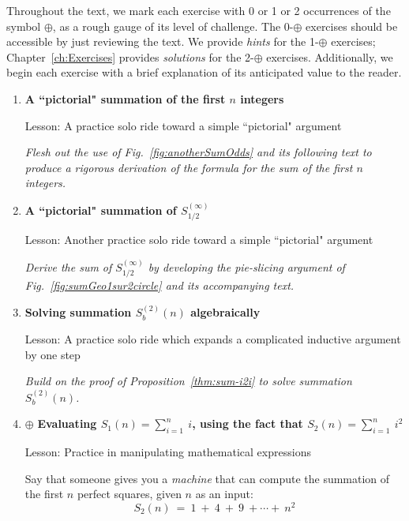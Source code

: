 Throughout the text, we mark each exercise with 0 or 1 or 2 occurrences of the symbol $\oplus$, as a rough gauge of its level of challenge.  The 0-$\oplus$ exercises should be accessible by just reviewing the text.  We provide {\em hints} for the 1-$\oplus$ exercises; Chapter~\ref{ch:Exercises} provides {\em solutions} for the 2-$\oplus$ exercises.  Additionally, we begin each exercise with a brief explanation of its anticipated value to the reader.

\begin{enumerate}
\item
{\bf A ``pictorial" summation of the first $n$ integers}

{\sc Lesson:} A practice solo ride toward a simple ``pictorial" argument

\smallskip

{\em Flesh out the use of Fig.~\ref{fig:anotherSumOdds} and its following text to produce a rigorous derivation of the formula for the sum of the first $n$ integers.}
\smallskip

\medskip\item
{\bf A ``pictorial" summation of $S^{(\infty)}_{1/2}$}

{\sc Lesson:} Another practice solo ride toward a simple ``pictorial" argument

\smallskip

{\em Derive the sum of $S^{(\infty)}_{1/2}$ by developing the pie-slicing argument of Fig.~\ref{fig:sumGeo1sur2circle} and its accompanying text.}

\smallskip

\medskip\item
{\bf Solving summation $S_b^{(2)}(n)$ algebraically}

{\sc Lesson:} A practice solo ride which expands a complicated inductive argument by one step

\smallskip

{\em Build on the proof of Proposition~\ref{thm:sum-i2i} to solve summation $S_b^{(2)}(n)$.}
\medskip

\medskip\item
$\oplus$ 
{\bf Evaluating $S_1(n) = \sum_{i=1}^n \ i$, using the fact that $S_2(n) = \sum_{i=1}^n \ i^2$}

{\sc Lesson:} Practice in manipulating mathematical expressions

\smallskip

Say that someone gives you a \textit{machine} that can compute the summation of the first $n$ perfect squares, given $n$ as an input:
\[ S_2(n)  \ = \ 1 \  + \ 4 \ + \ 9 \ +  \cdots + \ n^2 \]


\end{enumerate}
